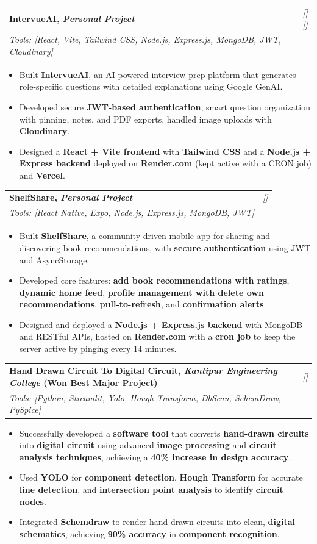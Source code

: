 \documentclass[a4paper,11pt]{article}
\makeatletter
\newcommand{\resumeProject}[4]{
\vspace{0.5mm}\item
    \begin{tabular*}{0.98\textwidth}[t]{l@{\extracolsep{\fill}}r}
        \textbf{#1} & \textit{\footnotesize{#3}} \\
        \footnotesize{\textit{#2}} & \footnotesize{#4}
    \end{tabular*}
    \vspace{-2.4mm}
}
\newcommand{\resumeItemListStart}{\begin{itemize}[leftmargin=*,labelsep=1mm,itemsep=0.5mm]}
\newcommand{\resumeItemListEnd}{\end{itemize}\vspace{-2mm}}
\makeatother
\begin{document}
  \resumeProject
  {IntervueAI, \textit{Personal Project}}
  {Tools: [React, Vite, Tailwind CSS, Node.js, Express.js, MongoDB, JWT, Cloudinary]}
  {{}[\href{https://github.com/aayush105/IntervueAI}{\textcolor{darkblue}{\faGithub}}] {}[\href{https://intervue-ai-six.vercel.app/}{\textcolor{darkblue}{\faIcon{globe}}}]}
  {}
  \resumeItemListStart
    \item Built \textbf{IntervueAI}, an AI-powered interview prep platform that generates role-specific questions with detailed explanations using Google GenAI.
    \item Developed secure \textbf{JWT-based authentication}, smart question organization with pinning, notes, and PDF exports, handled image uploads with \textbf{Cloudinary}.
    \item Designed a \textbf{React + Vite frontend} with \textbf{Tailwind CSS} and a \textbf{Node.js + Express backend} deployed on \textbf{Render.com} (kept active with a CRON job) and \textbf{Vercel}.

  \resumeItemListEnd

\resumeProject
{ShelfShare, \textit{Personal Project}}
{Tools: [React Native, Expo, Node.js, Express.js, MongoDB, JWT]}
  {{}[\href{https://github.com/aayush105/ShelfShare}{\textcolor{darkblue}{\faGithub}}]}
  {}
\resumeItemListStart
\item Built \textbf{ShelfShare}, a community-driven mobile app for sharing and discovering book recommendations, with \textbf{secure authentication} using JWT and AsyncStorage.
\item Developed core features: \textbf{add book recommendations with ratings}, \textbf{dynamic home feed}, \textbf{profile management with delete own recommendations}, \textbf{pull-to-refresh}, and \textbf{confirmation alerts}.
\item Designed and deployed a \textbf{Node.js + Express.js backend} with MongoDB and RESTful APIs, hosted on \textbf{Render.com} with a \textbf{cron job} to keep the server active by pinging every 14 minutes.
\resumeItemListEnd

\resumeProject
  {Hand Drawn Circuit To Digital Circuit, \textit{Kantipur Engineering College} (Won Best Major Project)}
  {Tools: [Python, Streamlit, Yolo, Hough Transform, DbScan, SchemDraw, PySpice]}
  {{}[\href{https://github.com/orgs/H2DC/repositories}{\textcolor{darkblue}{\faGithub}}]}
  {}
\resumeItemListStart
  \item Successfully developed a \textbf{software tool} that converts \textbf{hand-drawn circuits} into \textbf{digital circuit} using advanced \textbf{image processing} and \textbf{circuit analysis techniques}, achieving a \textbf{40\% increase in design accuracy}.
  \item Used \textbf{YOLO} for \textbf{component detection}, \textbf{Hough Transform} for accurate \textbf{line detection}, and \textbf{intersection point analysis} to identify \textbf{circuit nodes}.
  \item Integrated \textbf{Schemdraw} to render hand-drawn circuits into clean, \textbf{digital schematics}, achieving \textbf{90\% accuracy} in \textbf{component recognition}.
\resumeItemListEnd
\end{document}
